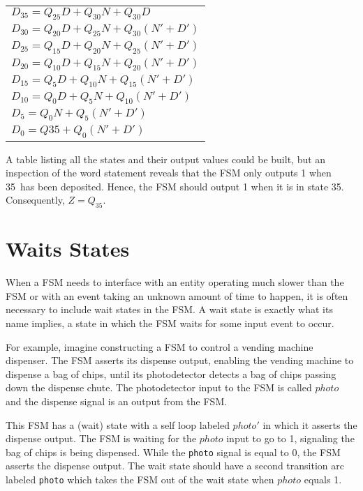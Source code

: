 \begin{tabular}{l}

$D_{35} = Q_{25}D + Q_{30}N + Q_{30}D$ \\
$D_{30} = Q_{20}D + Q_{25}N + Q_{30}(N'+D')$ \\
$D_{25} = Q_{15}D + Q_{20}N + Q_{25}(N'+D')$ \\
$D_{20} = Q_{10}D + Q_{15}N + Q_{20}(N'+D')$ \\
$D_{15} = Q_{5}D +  Q_{10}N + Q_{15}(N'+D')$ \\
$D_{10} = Q_{0}D +  Q_{5}N  + Q_{10}(N'+D')$ \\
$D_{5}  =           Q_{0}N  + Q_{5}(N'+D')$ \\
$D_{0}  = Q{35} + Q_{0}(N'+D')$ \\

\end{tabular}

A table listing all the states and their output values could be built,
but an inspection of the word statement reveals that the FSM only
outputs 1 when 35\textcent~has been deposited.  Hence, the FSM should
output 1 when it is in state 35\textcent.  Consequently, $Z=Q_{35}$.


\section{Waits States}
When a FSM needs to interface with an entity operating much
slower than the FSM or with an event taking an unknown amount 
of time to happen, it is often necessary to include wait states in 
the FSM.  A wait state is exactly what its name implies, a state in
which the FSM waits for some input event to occur.

For example, imagine  constructing a FSM to control
a vending machine dispenser.  The FSM asserts its dispense output, 
enabling the vending machine to dispense a bag of chips, until its 
photodetector detects a bag of chips passing down the
dispense chute.  The photodetector input to the FSM is called
$photo$ and the dispense signal is an output from the FSM.

This FSM has a (wait) state with a self loop labeled 
$photo'$ in which it asserts the dispense output.  The FSM is
waiting for the $photo$ input to go to 1, signaling the bag of
chips is being dispensed.  While the \verb+photo+ signal is equal to 
0, the FSM asserts the dispense output.  The wait state should have
a second transition arc labeled \verb+photo+ which takes the FSM out
of the wait state when $photo$ equals 1.


